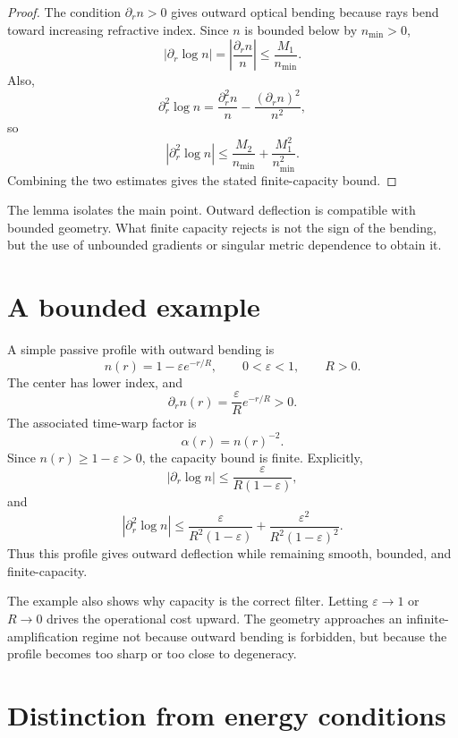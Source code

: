 \documentclass[11pt]{article}
\begin{document}
\begin{proof}
The condition $\partial_r n>0$ gives outward optical bending because rays bend toward increasing refractive index.  Since $n$ is bounded below by $n_{\min}>0$,
\[
        |\partial_r\log n|
        =
        \left|\frac{\partial_r n}{n}\right|
        \le
        \frac{M_1}{n_{\min}}.
\]
Also,
\[
        \partial_r^2\log n
        =
        \frac{\partial_r^2 n}{n}
        -
        \frac{(\partial_r n)^2}{n^2},
\]
so
\[
        |\partial_r^2\log n|
        \le
        \frac{M_2}{n_{\min}}
        +
        \frac{M_1^2}{n_{\min}^2}.
\]
Combining the two estimates gives the stated finite-capacity bound.
\end{proof}

The lemma isolates the main point.  Outward deflection is compatible with bounded geometry.  What finite capacity rejects is not the sign of the bending, but the use of unbounded gradients or singular metric dependence to obtain it.

\section{A bounded example}

A simple passive profile with outward bending is
\[
        n(r)=1-\varepsilon e^{-r/R},
        \qquad
        0<\varepsilon<1,
        \qquad R>0.
\]
The center has lower index, and
\[
        \partial_r n(r)
        =
        \frac{\varepsilon}{R}e^{-r/R}>0.
\]
The associated time-warp factor is
\[
        \alpha(r)=n(r)^{-2}.
\]
Since $n(r)\ge 1-\varepsilon>0$, the capacity bound is finite.  Explicitly,
\[
        |\partial_r\log n|
        \le
        \frac{\varepsilon}{R(1-\varepsilon)},
\]
and
\[
        |\partial_r^2\log n|
        \le
        \frac{\varepsilon}{R^2(1-\varepsilon)}
        +
        \frac{\varepsilon^2}{R^2(1-\varepsilon)^2}.
\]
Thus this profile gives outward deflection while remaining smooth, bounded, and finite-capacity.

The example also shows why capacity is the correct filter.  Letting $\varepsilon\to 1$ or $R\to 0$ drives the operational cost upward.  The geometry approaches an infinite-amplification regime not because outward bending is forbidden, but because the profile becomes too sharp or too close to degeneracy.

\section{Distinction from energy conditions}
\end{document}
